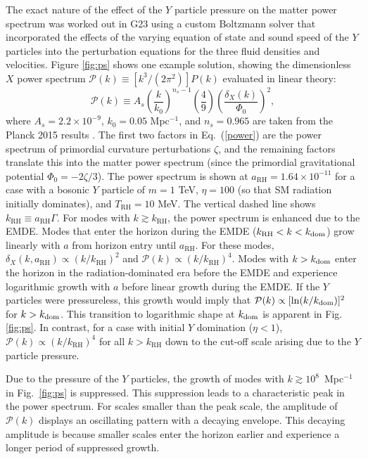 \documentclass[a4paper,11pt]{article}
\newcommand{\rh}[1]{{#1}_{\mathrm{RH}}}
\begin{document}
The exact nature of the effect of the $Y$ particle pressure on the matter power spectrum was worked out in G23 using a custom Boltzmann solver that incorporated the effects of the varying equation of state and sound speed of the $Y$ particles into the perturbation equations for the three fluid densities and velocities. Figure \ref{fig:ps} shows one example solution, showing the dimensionless $X$ power spectrum $\mathcal{P}(k)\equiv[k^3/(2\pi^2)]P(k)$ evaluated in linear theory: \begin{equation}\label{power}
    \mathcal{P}(k) \equiv A_s \left(\frac{k}{k_0} \right)^{n_s-1} \left( \frac{4}{9} \right) \left(\frac{\delta_X(k)}{\Phi_0} \right)^2,
\end{equation} where $A_s = 2.2 \times 10^{-9}$, $k_0 = 0.05$ Mpc$^{-1}$, and $n_s = 0.965$ are taken from the Planck 2015 results \cite{planck15}.
The first two factors in Eq.~(\ref{power}) are the power spectrum of primordial curvature perturbations $\zeta$, and the remaining factors translate this into the matter power spectrum (since the primordial gravitational potential $\Phi_0 = -2\zeta / 3$).
The power spectrum is shown at $\rh{a} = 1.64 \times 10^{-11}$ for a case with a bosonic $Y$ particle of $m = 1$ TeV, $\eta = 100$ (so that SM radiation initially dominates), and $\rh{T} = 10$ MeV. The vertical dashed line shows $\rh{k} \equiv \rh{a} \Gamma$. For modes with $k \gtrsim \rh{k}$, the power spectrum is enhanced due to the EMDE. Modes that enter the horizon during the EMDE ($\rh{k} < k < k_{\rm dom}$) grow linearly with $a$ from horizon entry until $\rh{a}$. For these modes, $\delta_X(k,\rh{a}) \propto (k/\rh{k})^2$ and $\mathcal{P}(k) \propto (k/\rh{k})^4$. Modes with $k > k_{\rm dom}$ enter the horizon in the radiation-dominated era before the EMDE and experience logarithmic growth with $a$ before linear growth during the EMDE. If the $Y$ particles were pressureless, this growth would imply that $\mathcal{P}(k) \propto [\ln (k/k_{\rm dom})]^2$ for $k > k_{\rm dom}$. This transition to logarithmic shape at $k_{\rm dom}$ is apparent in Fig. \ref{fig:ps}. In contrast, for a case with initial $Y$ domination ($\eta<1$), $\mathcal{P}(k) \propto (k/\rh{k})^4$ for all $k > \rh{k}$ down to the cut-off scale arising due to the $Y$ particle pressure.


Due to the pressure of the $Y$ particles, the growth of modes with $k \gtrsim 10^8$~Mpc$^{-1}$ in Fig.~\ref{fig:ps} is suppressed. This suppression leads to a characteristic peak in the power spectrum. For scales smaller than the peak scale, the amplitude of $\mathcal{P}(k)$ displays an oscillating pattern with a decaying envelope. This decaying amplitude is because smaller scales enter the horizon earlier and experience a longer period of suppressed growth. 
\end{document}
